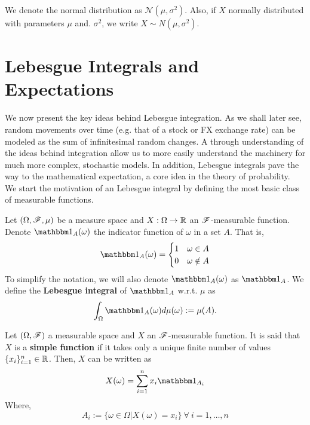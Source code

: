 \documentclass[../TGMAFFIRO.tex]{subfiles}
\begin{document}
We denote the normal distribution as $\mathcal{N}(\mu, \sigma^2)$. Also, if $X$ normally distributed with parameters $\mu$ and. $\sigma^2$, we write $X \sim N(\mu, \sigma^2)$.


\section{Lebesgue Integrals and Expectations}
We now present the key ideas behind Lebesgue integration. As we shall later see, random movements over time (e.g. that of a stock or FX exchange rate) can be modeled as the sum of infinitesimal random changes. A through understanding of the ideas behind integration allow us to more easily understand the machinery for much more complex, stochastic models. In addition, Lebesgue integrals pave the way to the mathematical expectation, a core idea in the theory of probability.\\

We start the motivation of an Lebesgue integral by defining the most basic class of measurable functions.

\begin{definition}
	Let $(\Omega, \mathscr{F}, \mu)$ be a measure space and $X: \Omega \to \mathbb{R}$ an $\mathscr{F}$-measurable function. Denote $\ind_A(\omega)$ the indicator function of $\omega$ in a set $A$. That is,
	\[
	\ind_A(\omega) = 
		\begin{cases}
			1 & \omega \in A \\
			0 & \omega \notin A
		\end{cases}
	\]
	To simplify the notation, we will also denote $\ind_A(\omega)$ as $\ind_A$.
	We define the \textbf{Lebesgue integral} of $\ind_A$ w.r.t. $\mu$ as
	\begin{equation}
		\int_\Omega \ind_A(\omega) d\mu(\omega) := \mu(A).
	\end{equation}
	
\end{definition}

\begin{definition}
	Let $(\Omega, \mathscr{F})$ a measurable space and $X$ an $\mathscr{F}$-measurable function. It is said that $X$ is a \textbf{simple function} if it takes only a unique finite number of values $\{x_i\}_{i=1}^{n} \in \mathbb{R}$. Then, $X$ can be written as
	\begin{equation}
		X(\omega) = \sum_{i=1}^{n}x_i\ind_{A_i}
	\end{equation}
	Where,
	\[
		A_i := \{\omega \in \Omega | X(\omega) = x_i\} \ \forall \ i = 1, \ldots, n
	\]
\end{definition}
\end{document}
